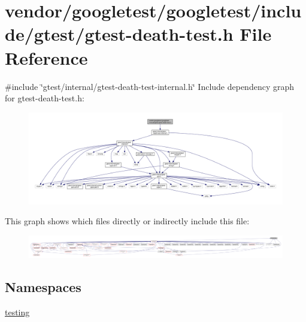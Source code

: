 \hypertarget{gtest-death-test_8h}{}\section{vendor/googletest/googletest/include/gtest/gtest-\/death-\/test.h File Reference}
\label{gtest-death-test_8h}
{\ttfamily \#include \char`\"{}gtest/internal/gtest-\/death-\/test-\/internal.\+h\char`\"{}}\newline
Include dependency graph for gtest-\/death-\/test.h\+:
\nopagebreak
\begin{figure}[H]
\begin{center}
\leavevmode
\includegraphics[width=350pt]{gtest-death-test_8h__incl}
\end{center}
\end{figure}
This graph shows which files directly or indirectly include this file\+:
\nopagebreak
\begin{figure}[H]
\begin{center}
\leavevmode
\includegraphics[width=350pt]{gtest-death-test_8h__dep__incl}
\end{center}
\end{figure}
\subsection*{Namespaces}
\begin{DoxyCompactItemize}
\item 
 \hyperlink{namespacetesting}{testing}
\end{DoxyCompactItemize}
